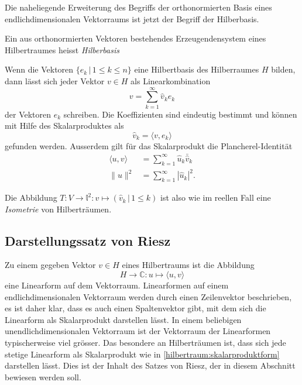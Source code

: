 Die naheliegende Erweiterung des Begriffs der orthonormierten Basis
eines endlichdimensionalen Vektorraums ist jetzt der Begriff der
Hilberbasis.

\begin{definition}
Ein aus orthonormierten Vektoren bestehendes Erzeugendensystem
eines Hilbertraumes heisst {\em Hilberbasis}
\end{definition}

\begin{satz}
Wenn die Vektoren $\{e_k\,|\, 1\le k\le n\}$ eine Hilbertbasis des
Hilberraumes $H$ bilden,
dann lässt sich jeder Vektor $v\in H$ als Linearkombination
\[
v
=
\sum_{k=1}^\infty \hat{v}_k e_k
\]
der Vektoren $e_k$ schreiben.
Die Koeffizienten sind eindeutig bestimmt und können mit Hilfe des
Skalarproduktes als
\[
\hat{v}_k = \langle v,e_k\rangle
\]
gefunden werden.
Ausserdem gilt für das Skalarprodukt die Plancherel-Identität
\begin{align*}
\langle u,v\rangle &= \sum_{k=1}^\infty \hat{u}_k\bar{\hat{v}}_k
\\
\| u \|^2 &= \sum_{k=1}^\infty |\hat{u}_k|^2.
\end{align*}
\end{satz}

Die Abbildung $T\colon V\to \mathbb l^2: v\mapsto (\hat{v}_k\,|\,1\le k)$
ist also wie im reellen Fall eine {\em Isometrie} von Hilberträumen.


\subsection{Darstellungssatz von Riesz
\label{subsection:riesz}}
Zu einem gegeben Vektor $v\in H$ eines Hilbertraums ist die Abbildung
\begin{equation}
H\to\mathbb C
:
u\mapsto \langle u,v\rangle
\label{hilbertraum:skalarproduktform}
\end{equation}
eine Linearform auf dem Vektorraum.
Linearformen auf einem endlichdimensionalen Vektorraum werden durch
einen Zeilenvektor beschrieben, es ist daher klar, dass es auch einen
Spaltenvektor gibt, mit dem sich die Linearform als Skalarprodukt
darstellen lässt.
In einem beliebigen unendlichdimensionalen Vektorraum ist der Vektorraum
der Linearformen typischerweise viel grösser.
Das besondere an Hilberträumen ist, dass sich jede stetige Linearform
als Skalarprodukt wie in \eqref{hilbertraum:skalarproduktform}
darstellen lässt.
Dies ist der Inhalt des Satzes von Riesz, der in diesem Abschnitt
bewiesen werden soll.

